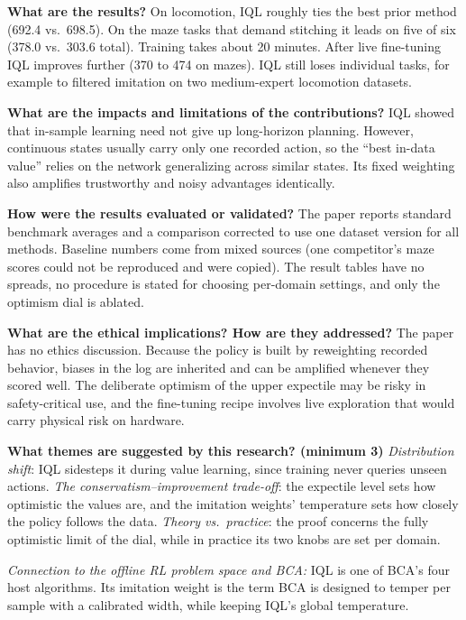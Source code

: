 \documentclass[11pt]{article}
\newcommand{\q}[2]{\item \textbf{#1} #2}
\newcommand{\tiein}[1]{\par\smallskip\noindent\emph{Connection to the offline RL problem space and BCA:} #1\par\medskip}
\begin{document}
\begin{qna}
\q{What are the results?}
On locomotion, IQL roughly ties the best prior method (692.4 vs.\ 698.5). On the maze tasks that demand stitching it leads on five of six (378.0 vs.\ 303.6 total). Training takes about 20 minutes. After live fine-tuning IQL improves further (370 to 474 on mazes). IQL still loses individual tasks, for example to filtered imitation on two medium-expert locomotion datasets.

\q{What are the impacts and limitations of the contributions?}
IQL showed that in-sample learning need not give up long-horizon planning. However, continuous states usually carry only one recorded action, so the ``best in-data value'' relies on the network generalizing across similar states. Its fixed weighting also amplifies trustworthy and noisy advantages identically.

\q{How were the results evaluated or validated?}
The paper reports standard benchmark averages and a comparison corrected to use one dataset version for all methods. Baseline numbers come from mixed sources (one competitor's maze scores could not be reproduced and were copied). The result tables have no spreads, no procedure is stated for choosing per-domain settings, and only the optimism dial is ablated.

\q{What are the ethical implications? How are they addressed?}
The paper has no ethics discussion. Because the policy is built by reweighting recorded behavior, biases in the log are inherited and can be amplified whenever they scored well. The deliberate optimism of the upper expectile may be risky in safety-critical use, and the fine-tuning recipe involves live exploration that would carry physical risk on hardware.

\q{What themes are suggested by this research? (minimum 3)}
\emph{Distribution shift}: IQL sidesteps it during value learning, since training never queries unseen actions. \emph{The conservatism--improvement trade-off}: the expectile level sets how optimistic the values are, and the imitation weights' temperature sets how closely the policy follows the data. \emph{Theory vs.\ practice}: the proof concerns the fully optimistic limit of the dial, while in practice its two knobs are set per domain.

\end{qna}
\tiein{IQL is one of BCA's four host algorithms. Its imitation weight is the term BCA is designed to temper per sample with a calibrated width, while keeping IQL's global temperature.}
\end{document}
